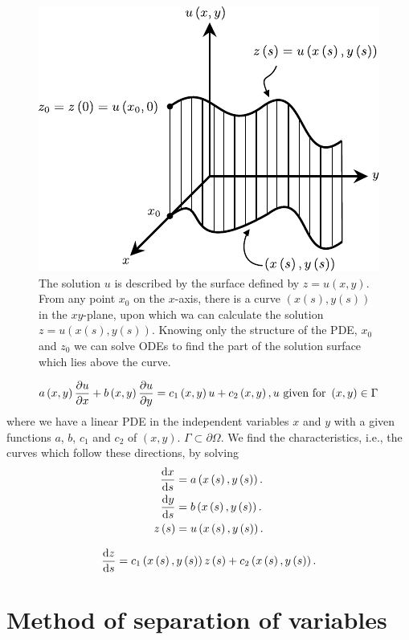 \begin{figure}[ht!]
	\centering
	\includegraphics[width=0.35\paperwidth]{characteristics}
	\caption{The solution $u$ is described by the surface defined by
		$z=u\left(x,y\right)$.
		From any point $x_{0}$ on the $x$-axis, there is a curve
		$\left(x\left(s\right),y\left(s\right)\right)$ in the
		$xy$-plane, upon which wa can calculate the solution
		$z=u\left(x\left(s\right),y\left(s\right)\right)$.
		Knowing only the structure of the PDE, $x_{0}$ and $z_{0}$ we
		can solve ODEs to find the part of the solution surface which
		lies above the curve.}
\end{figure}

\begin{equation*}
	a\left(x,y\right)\diffp{u}{x}+
	b\left(x,y\right)\diffp{u}{y}=
	c_{1}\left(x,y\right)u+
	c_{2}\left(x,y\right),
	u\text{ given for }\left(x,y\right)\in\Gamma
\end{equation*}
where we have a linear PDE in the independent variables $x$ and $y$
with a given functions $a$, $b$, $c_{1}$ and $c_{2}$ of $\left(x,y\right)$.
$\Gamma\subset\partial\Omega$.
We find the characteristics, i.e., the curves which follow these directions, by solving
\begin{align*}
	\diff{x}{s}     & =
	a\left(x\left(s\right),y\left(s\right)\right). \\
	\diff{y}{s}     & =
	b\left(x\left(s\right),y\left(s\right)\right). \\
	z\left(s\right) & =
	u\left(x\left(s\right),y\left(s\right)\right).
\end{align*}

\begin{equation*}
	\diff{z}{s}=
	c_{1}\left(x\left(s\right),y\left(s\right)\right)
	z\left(s\right)+
	c_{2}\left(x\left(s\right),y\left(s\right)\right).
\end{equation*}

\chapter{Method of separation of variables}

